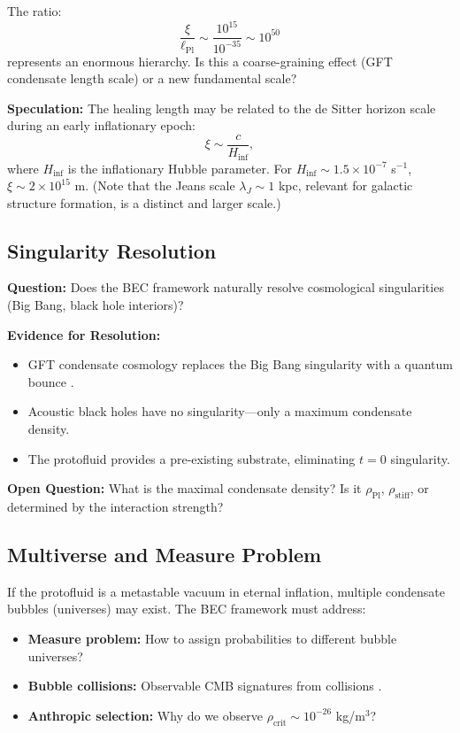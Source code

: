 \documentclass[11pt,a4paper]{article}
\newcommand{\lPl}{\ensuremath{\ell_{\mathrm{Pl}}}}
\newcommand{\rhocrit}{\ensuremath{\rho_{\mathrm{crit}}}}
\newcommand{\rhostiff}{\ensuremath{\rho_{\mathrm{stiff}}}}
\newcommand{\rhoPl}{\ensuremath{\rho_{\mathrm{Pl}}}}
\theoremstyle{definition}
\theoremstyle{remark}
\begin{document}
The ratio:
\begin{equation}
\frac{\xi}{\lPl} \sim \frac{10^{15}}{10^{-35}} \sim 10^{50}
\end{equation}
represents an enormous hierarchy. Is this a coarse-graining effect (GFT condensate length scale) or a new fundamental scale?

\textbf{Speculation:} The healing length may be related to the de Sitter horizon scale during an early inflationary epoch:
\begin{equation}
\xi \sim \frac{c}{H_{\mathrm{inf}}},
\end{equation}
where $H_{\mathrm{inf}}$ is the inflationary Hubble parameter. For $H_{\mathrm{inf}} \sim 1.5 \times 10^{-7}$ s$^{-1}$, $\xi \sim 2 \times 10^{15}$ m. (Note that the Jeans scale $\lambda_J \sim 1$ kpc, relevant for galactic structure formation, is a distinct and larger scale.)

\subsection{Singularity Resolution}
\label{sec:singularity_resolution}

\textbf{Question:} Does the BEC framework naturally resolve cosmological singularities (Big Bang, black hole interiors)?

\textbf{Evidence for Resolution:}
\begin{itemize}
\item GFT condensate cosmology replaces the Big Bang singularity with a quantum bounce \cite{Oriti2016}.
\item Acoustic black holes have no singularity---only a maximum condensate density.
\item The protofluid provides a pre-existing substrate, eliminating $t=0$ singularity.
\end{itemize}

\textbf{Open Question:} What is the maximal condensate density? Is it $\rhoPl$, $\rhostiff$, or determined by the interaction strength?

\subsection{Multiverse and Measure Problem}
\label{sec:multiverse}

If the protofluid is a metastable vacuum in eternal inflation, multiple condensate bubbles (universes) may exist. The BEC framework must address:
\begin{itemize}
\item \textbf{Measure problem:} How to assign probabilities to different bubble universes?
\item \textbf{Bubble collisions:} Observable CMB signatures from collisions \cite{Feeney2011}.
\item \textbf{Anthropic selection:} Why do we observe $\rhocrit \sim 10^{-26}$ kg/m$^3$?
\end{itemize}
\end{document}

